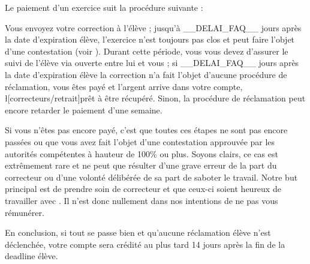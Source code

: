 ﻿Le paiement d'un exercice suit la procédure suivante :

\begin{itemize}
	\li Vous envoyez votre correction à l'élève ;
	\li jusqu'à __DELAI_FAQ__ jours après la date d'expiration élève, l'exercice n'est toujours pas clos et peut faire l'objet d'une contestation (voir ). Durant cette période, vous vous devez d'assurer le suivi de l'élève via  ouverte entre lui et vous ;
	\li si __DELAI_FAQ__ jours après la date d'expiration élève la correction n'a fait l'objet d'aucune procédure de réclamation, vous êtes payé et l'argent arrive dans votre compte, \l[correcteurs/retrait]{prêt à être récupéré}. Sinon, la procédure de réclamation peut encore retarder le paiement d'une semaine.
\end{itemize}

Si vous n'êtes pas encore payé, c'est que toutes ces étapes ne sont pas encore passées ou que vous avez fait l'objet d'une contestation approuvée par les autorités compétentes à hauteur de 100\% ou plus. Soyons clairs, ce cas est extrêmement rare et ne peut que résulter d'une grave erreur de la part du correcteur ou d'une volonté délibérée de sa part de saboter le travail. Notre but principal est de prendre soin de correcteur et que ceux-ci soient heureux de travailler avec \eDevoir. Il n'est donc nullement dans nos intentions de ne pas vous rémunérer.

En conclusion, si tout se passe bien et qu'aucune réclamation élève n'est déclenchée, votre compte \eDevoir sera crédité au plus tard 14 jours après la fin de la deadline élève.